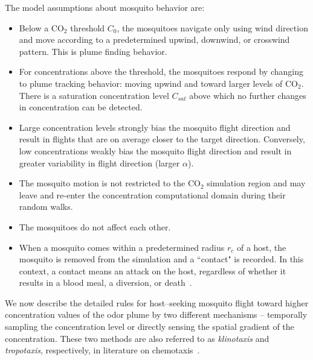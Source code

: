 \documentclass[10pt]{article}
\begin{document}
The model assumptions about mosquito behavior are:
\begin{itemize}
\item
Below a CO$_2$ threshold $C_0$, the mosquitoes navigate only using wind direction and move according to a predetermined upwind, downwind, or crosswind pattern.  This is plume finding behavior.
\item For concentrations above the threshold, the
    mosquitoes respond by changing to plume tracking behavior: moving upwind and
   toward larger levels of CO$_2$. There is a saturation concentration level
    $C_{sat}$ above which no further changes in concentration can be detected.
\item Large concentration levels strongly bias the mosquito flight direction and result in 
flights that are on average closer to the target direction.  Conversely, low 
concentrations weakly bias the mosquito flight direction and result in greater variability in flight direction (larger $\alpha$).
\item The mosquito motion is not restricted to the CO$_2$ simulation region and may leave and re-enter the
    concentration computational domain during their random walks.
\item The mosquitoes do not affect each other.
\item When a mosquito comes within a predetermined radius
    $r_c$ of a host, the mosquito is removed from the simulation and a ``contact" is recorded. In this
    context, a contact means an attack on the host, regardless of whether it results in a blood meal, a diversion, or 
    death~\cite{OkumuModel2010}.  
\end{itemize}
	
	
	We now describe the detailed rules for host--seeking mosquito flight toward higher concentration values of the odor plume by two different mechanisms -- temporally sampling the concentration level or directly sensing the spatial gradient of the concentration. These two methods are also referred to as \textit{klinotaxis} and \textit{tropotaxis}, respectively, in literature on chemotaxis~\cite{Vickers2000}.

\end{document}
